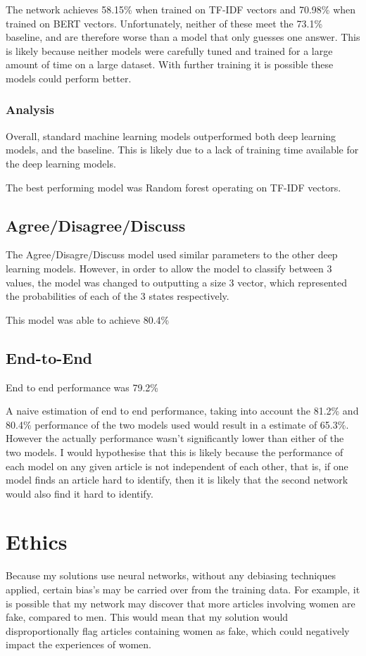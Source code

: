 \documentclass{article}
\begin{document}
			The network achieves 58.15\% when trained on TF-IDF vectors and 70.98\% when trained on BERT vectors.
			Unfortunately, neither of these meet the 73.1\% baseline, and are therefore worse than a model that only guesses one answer.
			This is likely because neither models were carefully tuned and trained for a large amount of time on a large dataset. With further training it is possible these models could perform better.

		\subsubsection{Analysis}
			Overall, standard machine learning models outperformed both deep learning models, and the baseline.
			This is likely due to a lack of training time available for the deep learning models.
			
			The best performing model was Random forest operating on TF-IDF vectors.

	\subsection{Agree/Disagree/Discuss}

		The Agree/Disagre/Discuss model used similar parameters to the other deep learning models.
		However, in order to allow the model to classify between 3 values, the model was changed to outputting a size 3 vector, which represented the probabilities of each of the 3 states respectively.

		This model was able to achieve 80.4\%
	\subsection{End-to-End}

		End to end performance was 79.2\%

		A naive estimation of end to end performance, taking into account the 81.2\% and 80.4\% performance of the two models used would result in a estimate of 65.3\%.
		However the actually performance wasn't significantly lower than either of the two models.
		I would hypothesise that this is likely because the performance of each model on any given article is not independent of each other, that is, if one model finds an article hard to identify, then it is likely that the second network would also find it hard to identify.

\section{Ethics}
	Because my solutions use neural networks, without any debiasing techniques applied, certain bias's may be carried over from the training data.
	For example, it is possible that my network may discover that more articles involving women are fake, compared to men. 
	This would mean that my solution would disproportionally flag articles containing women as fake, which could negatively impact the experiences of women.
	
\end{document}
